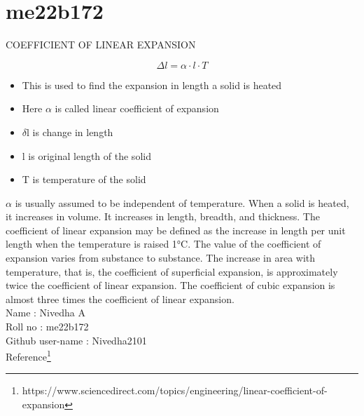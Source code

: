 \section{me22b172}
\begin{center}
    {\Large COEFFICIENT OF LINEAR EXPANSION}
\end{center}
\[\Delta l = \alpha \cdot l \cdot T\]
\begin{itemize}
    \item This is used to find the expansion in length a solid is heated
    \item Here $\alpha$ is called linear coefficient of expansion
    \item $\delta$l is change in length
    \item l is original length of the solid 
    \item T is temperature of the solid 
\end{itemize}
$\alpha$ is usually assumed to be independent of temperature. When a solid is heated, it increases in volume. It increases in length, breadth, and thickness. The coefficient of linear expansion may be defined as the increase in length per unit length when the temperature is raised 1°C. The value of the coefficient of expansion varies from substance to substance. The increase in area with temperature, that is, the coefficient of superficial expansion, is approximately twice the coefficient of linear expansion. The coefficient of cubic expansion is almost three times the coefficient of linear expansion.\\
Name : Nivedha A\\
Roll no : me22b172\\
Github user-name : Nivedha2101\\
Reference\footnote{https://www.sciencedirect.com/topics/engineering/linear-coefficient-of-expansion}
